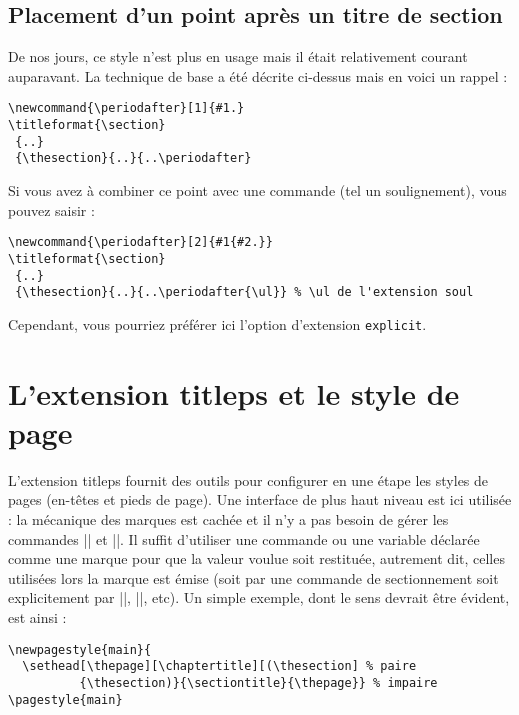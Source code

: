 \documentclass[a4paper]{ltxguide}
\begin{document}
\subsection{Placement d'un point après un titre de section}
\label{sec:dotafter}

De nos jours, ce style n'est plus en usage mais il était relativement courant
auparavant. 
La technique de base a été décrite ci-dessus mais en voici un rappel :
\begin{verbatim}
\newcommand{\periodafter}[1]{#1.}
\titleformat{\section}
 {..}
 {\thesection}{..}{..\periodafter}
\end{verbatim}

Si vous avez à combiner ce point avec une commande (tel un soulignement), vous pouvez
saisir :
\begin{verbatim}
\newcommand{\periodafter}[2]{#1{#2.}}
\titleformat{\section}
 {..}
 {\thesection}{..}{..\periodafter{\ul}} % \ul de l'extension soul
\end{verbatim}

Cependant, vous pourriez préférer ici l'option d'extension \texttt{explicit}.

\section{L'extension \textsf{titleps} et le style de page}

L'extension \textsf{titleps} fournit des outils pour configurer en une 
étape les styles de pages (en-têtes et pieds de page). Une interface de plus haut
niveau est ici utilisée : la mécanique des marques est cachée et il n'y a
pas besoin de gérer les commandes |\leftmark| et |\rightmark|. Il suffit d'utiliser
une commande ou une variable déclarée comme une \og marque \fg{} pour que la valeur
voulue soit restituée, autrement dit, celles utilisées lors la marque est émise (soit 
par une commande de sectionnement soit explicitement par |\chaptermark|, 
|\sectionmark|, etc). Un simple exemple, dont le sens devrait être évident, est ainsi :
\begin{verbatim}
\newpagestyle{main}{
  \sethead[\thepage][\chaptertitle][(\thesection] % paire
          {\thesection)}{\sectiontitle}{\thepage}} % impaire
\pagestyle{main}
\end{verbatim}
\end{document}
